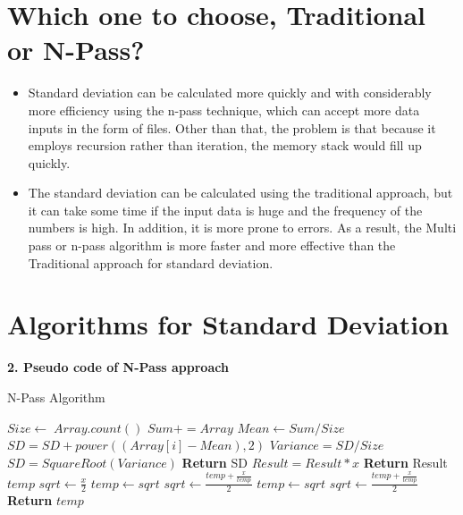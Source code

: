 \documentclass[12pt,a4paper]{report}
\begin{document}
\section*{Which one to choose, Traditional or N-Pass?}
\begin{itemize}[noitemsep]
        \item Standard deviation can be calculated more quickly and with considerably more efficiency using the n-pass technique, which can accept more data inputs in the form of files. Other than that, the problem is that because it employs recursion rather than iteration, the memory stack would fill up quickly.
        \item The standard deviation can be calculated using the traditional approach, but it can take some time if the input data is huge and the frequency of the numbers is high. In addition, it is more prone to errors. As a result, the Multi pass or n-pass algorithm is more faster and more effective than the Traditional approach for standard deviation.

    \end{itemize}

\newpage
\section*{Algorithms for Standard Deviation}
\textbf{2. Pseudo code of N-Pass approach}\\
\begin{algorithm}
\caption{N-Pass Algorithm}
\begin{algorithmic}[1]

    \State $Size \leftarrow \;Array.count()$
    \State $Sum+=Array$
    \EndFor
    \State $Mean \leftarrow Sum/Size$
    \State $SD=SD+power((Array[i]-Mean),2)$
    \EndFor
    \State $Variance=SD/Size$
    \State $SD=SquareRoot(Variance)$    
    \State \textbf{Return} SD
    \EndProcedure
\Statex
{}
    \State $Result=Result*x$
    \EndFor
    \State \textbf{Return} Result
    \EndProcedure
\Statex
{}
    \State $temp$
    \State $sqrt \leftarrow \frac{x}{2}$
    \State $temp \leftarrow sqrt$
    \State $sqrt \leftarrow \frac{temp +\frac{x}{temp}}{2} $
    \State $temp \leftarrow sqrt$
    \State $sqrt \leftarrow \frac{temp +\frac{x}{temp}}{2} $
    \EndWhile
    \State \textbf{Return} $temp$
    \EndProcedure
\Statex
\end{algorithmic}
\end{algorithm}
\newpage
\end{document}
